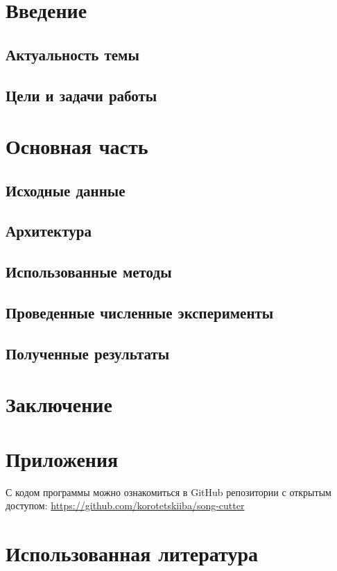 \documentclass[main.tex]{subfiles}
\begin{document}
	\section{Введение}
	\subsection{Актуальность темы}
	
	\subsection{Цели и задачи работы}
	
	\section{Основная часть}
	\subsection{Исходные данные}
	
	\subsection{Архитектура}
	
	\subsection{Использованные методы}
	
	\subsection{Проведенные численные эксперименты}
	
	\subsection{Полученные результаты}
	
	\section{Заключение}
	
	\section{Приложения}
	С кодом программы можно ознакомиться в GitHub репозитории с открытым доступом: \url{https://github.com/korotetskiiba/song-cutter}
	\newpage
	\section{Использованная литература}
	\printbibliography
\end{document}
